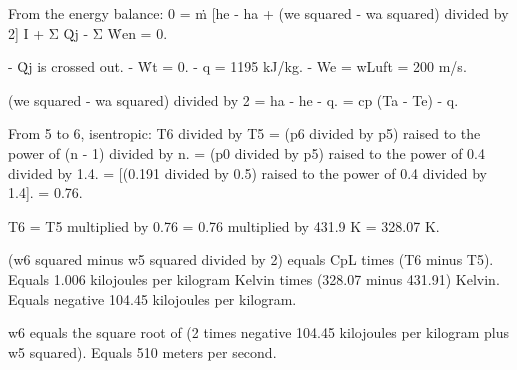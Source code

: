 From the energy balance:  
0 = ṁ [he - ha + (we squared - wa squared) divided by 2] I + Σ Q̇j - Σ Ẇen = 0.  

- Q̇j is crossed out.  
- Ẇt = 0.  
- q = 1195 kJ/kg.  
- We = wLuft = 200 m/s.  

(we squared - wa squared) divided by 2 = ha - he - q.  
= cp (Ta - Te) - q.  

From 5 to 6, isentropic:  
T6 divided by T5 = (p6 divided by p5) raised to the power of (n - 1) divided by n.  
= (p0 divided by p5) raised to the power of 0.4 divided by 1.4.  
= [(0.191 divided by 0.5) raised to the power of 0.4 divided by 1.4].  
= 0.76.  

T6 = T5 multiplied by 0.76 = 0.76 multiplied by 431.9 K = 328.07 K.

(w6 squared minus w5 squared divided by 2) equals CpL times (T6 minus T5).  
Equals 1.006 kilojoules per kilogram Kelvin times (328.07 minus 431.91) Kelvin.  
Equals negative 104.45 kilojoules per kilogram.  

w6 equals the square root of (2 times negative 104.45 kilojoules per kilogram plus w5 squared).  
Equals 510 meters per second.